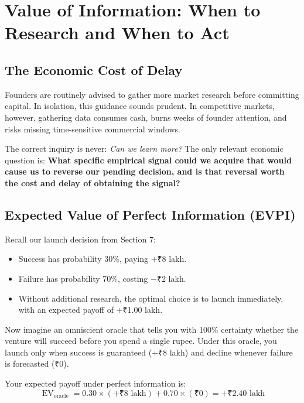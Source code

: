 \section{Value of Information: When to Research and When to Act}

\subsection{The Economic Cost of Delay}

Founders are routinely advised to gather more market research before committing capital. In isolation, this guidance sounds prudent. In competitive markets, however, gathering data consumes cash, burns weeks of founder attention, and risks missing time-sensitive commercial windows.

The correct inquiry is never: \textit{Can we learn more?} The only relevant economic question is: \textbf{What specific empirical signal could we acquire that would cause us to reverse our pending decision, and is that reversal worth the cost and delay of obtaining the signal?}

\subsection{Expected Value of Perfect Information (EVPI)}

Recall our launch decision from Section 7:
\begin{itemize}[leftmargin=10pt,itemsep=1pt,topsep=1pt]
  \item Success has probability 30\%, paying +₹8 lakh.
  \item Failure has probability 70\%, costing $-$₹2 lakh.
  \item Without additional research, the optimal choice is to launch immediately, with an expected payoff of +₹1.00 lakh.
\end{itemize}

Now imagine an omniscient oracle that tells you with 100\% certainty whether the venture will succeed before you spend a single rupee. Under this oracle, you launch only when success is guaranteed (+₹8 lakh) and decline whenever failure is forecasted (₹0).

Your expected payoff under perfect information is:
\begin{equation*}
\operatorname{EV}_{\text{oracle}} = 0.30 \times (+\text{₹}8\text{ lakh}) + 0.70 \times (\text{₹}0) = +\text{₹}2.40\text{ lakh}
\end{equation*}

